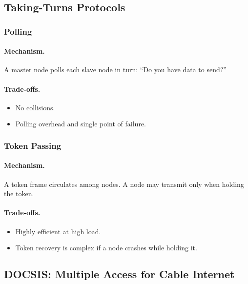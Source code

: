 \documentclass[12pt]{article}
\begin{document}
\subsection{Taking-Turns Protocols}

\subsubsection{Polling}

\paragraph{Mechanism.}
A master node polls each slave node in turn:
``Do you have data to send?''

\paragraph{Trade-offs.}
\begin{itemize}
    \item No collisions.
    \item Polling overhead and single point of failure.
\end{itemize}

\subsubsection{Token Passing}

\paragraph{Mechanism.}
A token frame circulates among nodes.
A node may transmit only when holding the token.

\paragraph{Trade-offs.}
\begin{itemize}
    \item Highly efficient at high load.
    \item Token recovery is complex if a node crashes while holding it.
\end{itemize}

\subsection{DOCSIS: Multiple Access for Cable Internet}
\end{document}
